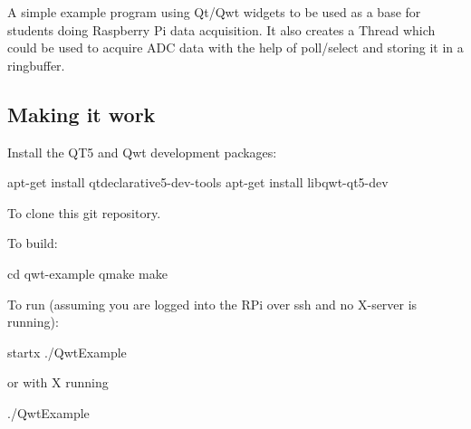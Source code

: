 A simple example program using Qt/\+Qwt widgets to be used as a base for students doing Raspberry Pi data acquisition. It also creates a Thread which could be used to acquire A\+DC data with the help of poll/select and storing it in a ringbuffer.



\subsection*{Making it work}

Install the Q\+T5 and Qwt development packages\+:


\begin{DoxyCode}
apt-get install qtdeclarative5-dev-tools
apt-get install libqwt-qt5-dev
\end{DoxyCode}


To clone this git repository.

To build\+:


\begin{DoxyCode}
cd qwt-example
qmake
make
\end{DoxyCode}


To run (assuming you are logged into the R\+Pi over ssh and no X-\/server is running)\+:


\begin{DoxyCode}
startx ./QwtExample
\end{DoxyCode}


or with X running


\begin{DoxyCode}
./QwtExample
\end{DoxyCode}
 